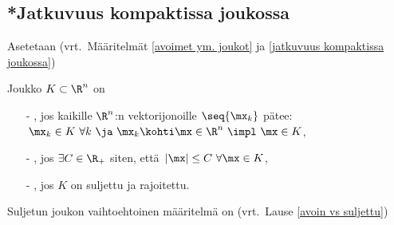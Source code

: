 \subsection*{*Jatkuvuus kompaktissa joukossa}

Asetetaan (vrt.\ Määritelmät \ref{avoimet ym. joukot} ja \ref{jatkuvuus kompaktissa joukossa})
\begin{Def} \label{kompakti joukko - Rn} Joukko $K\subset\R^n$ on
\begin{itemize}  
\item[-] , jos kaikille $\R^n$:n vektorijonoille $\seq{\mx_k}$ pätee: \newline
         $\,\mx_k \in K\ \forall k\ \ja\ \mx_k \kohti \mx\in\R^n\ \impl\ \mx \in K$,
\item[-] , jos $\exists C\in\R_+$ siten, että 
         $\,|\mx| \le C\ \forall \mx \in K$,
\item[-] , jos $K$ on suljettu ja rajoitettu.
\end{itemize}
\end{Def}
Suljetun joukon vaihtoehtoinen määritelmä on (vrt.\ Lause \ref{avoin vs suljettu})

